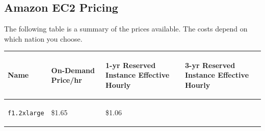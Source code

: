 \documentclass[a4paper]{article}
\begin{document}
    \subsection{Amazon EC2 Pricing}
    
    The following table is a summary of the prices available. The costs depend on which nation you choose.

    \begin{table}[!htp]
        \centering
        \begin{tabular}{@{} p{5em} p{7em} p{10em} p{10em} @{}}
            \toprule
            \begin{center}
                \textbf{Name}
            \end{center}
            & \begin{center}
                \vspace{-1.5em}
                \textbf{On-Demand Price/hr}
                \vspace{-1em}
            \end{center} 
            & \begin{center}
                \vspace{-1.5em}
                \textbf{1-yr Reserved Instance Effective Hourly}
                \vspace{-1em}
            \end{center}
            & \begin{center}
                \vspace{-1.5em}
                \textbf{3-yr Reserved Instance Effective Hourly}
                \vspace{-1em}
            \end{center} \\
            \midrule
            \begin{center}
                \vspace{-1.9em}
                \texttt{f1.2xlarge}
            \end{center} &
            \begin{center}
                \vspace{-1.5em}
                \$1.65
            \end{center} & 
            \begin{center}
                \vspace{-1.5em}
                \$1.06
            \end{center} & 
            \begin{center}

\end{center}
\end{tabular}
\end{table}
\end{document}
